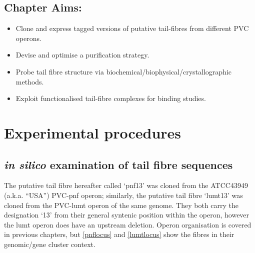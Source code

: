 \subsection*{Chapter Aims:}
\begin{itemize}
	\item Clone and express tagged versions of putative tail-fibres from different PVC operons.
	\item Devise and optimise a purification strategy.
	\item Probe tail fibre structure via biochemical/biophysical/crystallographic methods.
	\item Exploit functionalised tail-fibre complexes for binding studies.
\end{itemize}
\clearpage

\section{Experimental procedures}

\subsection{\emph{in silico} examination of tail fibre sequences}
The putative tail fibre hereafter called `pnf13' was cloned from the \Pasy{} ATCC43949 (a.k.a. ``USA'') PVC-pnf operon; similarly, the putative tail fibre `lumt13' was cloned from the PVC-lumt operon of the same genome. They both carry the designation `13' from their general syntenic position within the operon, however the lumt operon does have an upstream deletion. Operon organisation is covered in previous chapters, but \vref{pnflocus} and \vref{lumtlocus} show the fibres in their genomic/gene cluster context.

